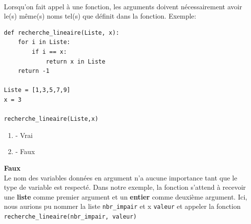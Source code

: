 \begin{Exercice}[2 minutes]\\
Lorsqu'on fait appel à une fonction, les arguments doivent nécessairement avoir le(s) même(s) noms tel(s) que définit dans la fonction. Exemple:\\
\begin{lstlisting}
def recherche_lineaire(Liste, x):
    for i in Liste:
        if i == x:
            return x in Liste
    return -1

Liste = [1,3,5,7,9]
x = 3

recherche_lineaire(Liste,x)

\end{lstlisting}
\begin{enumerate}
    \item - Vrai
    \item - Faux
\end{enumerate}
\begin{solution}
    \textbf{Faux}\\
    Le nom des variables données en argument n'a aucune importance tant que le type de variable est respecté. Dans notre exemple, la fonction s'attend à recevoir  une \textbf{liste} comme premier argument et un \textbf{entier} comme deuxième argument. Ici, nous aurions pu nommer la liste \lstinline{nbr_impair} et x \lstinline{valeur} et appeler la fonction \lstinline{recherche_lineaire(nbr_impair, valeur)}

\end{solution}
\end{Exercice}

